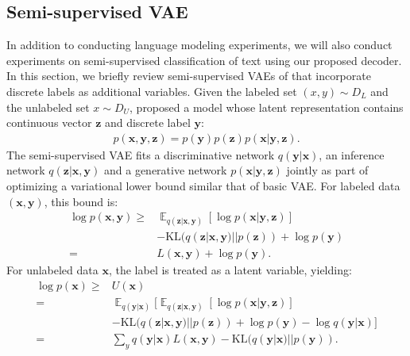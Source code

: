 \documentclass{article}
\DeclareMathOperator{\E}{\mathbb{E}}
\begin{document}
\subsection{Semi-supervised VAE}
In addition to conducting language modeling experiments, we will also conduct experiments on semi-supervised classification of text using our proposed decoder.
In this section, we briefly review
semi-supervised VAEs of \cite{kingma2014semi} that incorporate discrete labels as additional variables.
Given the labeled set
$(x, y) \sim D_{L}$ and the unlabeled set
$x \sim D_{U}$, \cite{kingma2014semi} proposed a model
whose latent representation contains continuous vector $\mathbf{z}$ and discrete label
$\mathbf{y}$:
\begin{align}
  p(\mathbf{x}, \mathbf{y}, \mathbf{z}) =
  p(\mathbf{y}) p(\mathbf{z}) p(\mathbf{x}|\mathbf{y}, \mathbf{z}).
\end{align}
The semi-supervised VAE fits a discriminative network
$q(\mathbf{y} | \mathbf{x})$, an inference network
$q(\mathbf{z}| \mathbf{x}, \mathbf{y})$ and a generative network
$p(\mathbf{x}|\mathbf{y},\mathbf{z})$ jointly as part of optimizing a variational lower
bound similar that of basic VAE. For labeled data $(\mathbf{x}, \mathbf{y})$,
this bound is:
\begin{align*}
  \log p(\mathbf{x}, \mathbf{y}) \geq & \E_{q(\mathbf{z}|\mathbf{x}, \mathbf{y})} [ \log p(\mathbf{x}
                        | \mathbf{y}, \mathbf{z})] \\
                      &- \text{KL}(q(\mathbf{z}|\mathbf{x}, \mathbf{y}) ||
                        p(\mathbf{z})) + \log p(\mathbf{y}) \\
  = &  L(\mathbf{x}, \mathbf{y}) + \log p(\mathbf{y}).
\end{align*}
For unlabeled data $\mathbf{x}$, the label is treated as a latent
variable, yielding:
{\small
\begin{align*}
  \log p(\mathbf{x}) \geq & U(\mathbf{x}) \\
  = & \E_{q(\mathbf{y}|\mathbf{x})}\big[\E_{q(\mathbf{z}|\mathbf{x}, \mathbf{y})} [ \log p(\mathbf{x}
      | \mathbf{y}, \mathbf{z})]  \\
                   &- \text{KL}(q(\mathbf{z}|\mathbf{x}, \mathbf{y}) ||
                     p(\mathbf{z})) + \log p(\mathbf{y})   - \log
                     q(\mathbf{y}|\mathbf{x})\big] \\
  = & \sum_{y}q(\mathbf{y}|\mathbf{x}) L(\mathbf{x}, \mathbf{y}) -
      \text{KL}(q(\mathbf{y}|\mathbf{x}) || p(\mathbf{y})).
\end{align*}
}
\end{document}
